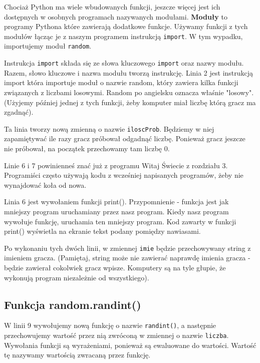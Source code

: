 \documentclass{book}
\begin{document}
Chociaż Python ma wiele wbudowanych funkcji, jeszcze więcej jest ich dostępnych w osobnych programach nazywanych modułami. {\bf Moduły} to programy Pythona które zawierają dodatkowe funkcje. Używamy funkcji z tych modułów łącząc je z naszym programem instrukcją \lstinline{import}. W tym wypadku, importujemy moduł \lstinline{random}.

Instrukcja \lstinline{import} składa się ze słowa kluczowego \lstinline{import} oraz nazwy modułu. Razem, słowo kluczowe i nazwa modułu tworzą instrukcję. Linia 2 jest instrukcją import która importuje moduł o nazwie random, który zawiera kilka funkcji związanych z liczbami losowymi. Random po angielsku oznacza właśnie "losowy". (Użyjemy później jednej z tych funkcji, żeby komputer miał liczbę którą gracz ma zgadnąć).



Ta linia tworzy nową zmienną o nazwie \lstinline{iloscProb}. Będziemy w niej zapamiętywać ile razy gracz próbował odgadnąć liczbę. Ponieważ gracz jeszcze nie próbował, na początek przechowamy tam liczbę 0.



Linie 6 i 7 powinienneś znać już z programu Witaj Świecie z rozdziału 3. Programiści często używają kodu z wcześniej napisanych programów, żeby nie wynajdować koła od nowa.

Linia 6 jest wywołaniem funkcji print(). Przypomnienie - funkcja jest jak mniejszy program uruchamiany przez nasz program. Kiedy nasz program wywołuje funkcję, uruchamia ten mniejszy program. Kod zawarty w funkcji print() wyświetla na ekranie tekst podany pomiędzy nawiasami.

Po wykonaniu tych dwóch linii, w zmiennej \lstinline{imie} będzie przechowywany string z imieniem gracza. (Pamiętaj, string może nie zawierać naprawdę imienia gracza - będzie zawierał cokolwiek gracz wpisze. Komputery są na tyle głupie, że wykonują program niezależnie od wszystkiego).

\subsection{Funkcja random.randint()}



W linii 9 wywołujemy nową  funkcję o nazwie \lstinline{randint()}, a następnie przechowujemy wartość przez nią zwróconą w zmiennej o nazwie \lstinline{liczba}. Wywołania funkcji są wyrażeniami, ponieważ są ewaluowane do wartości. Wartość tę nazywamy wartością zwracaną przez funkcję.
\end{document}

